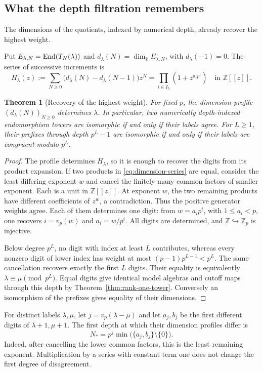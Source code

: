 \documentclass[11pt,reqno]{amsart}
\newcommand{\kk}{\Bbbk}\newcommand{\ZZ}{\mathbb Z}\newcommand{\NN}{\mathbb N}
\newtheorem{theorem}{Theorem}[section]
\theoremstyle{definition}
\theoremstyle{remark}
\numberwithin{equation}{section}
\begin{document}
\subsection{What the depth filtration remembers}
The dimensions of the quotients, indexed by numerical depth,
already recover the highest weight.

Put $E_{\lambda,N}=\operatorname{End}(T_N(\lambda))$ and
$d_\lambda(N)=\dim_\kk E_{\lambda,N}$, with $d_\lambda(-1)=0$.
The series of successive increments is
\begin{equation}\label{eq:dimension-series}
 H_\lambda(z):=\sum_{N\geq0}
       \bigl(d_\lambda(N)-d_\lambda(N-1)\bigr)z^N
   =\prod_{i\in I_\lambda}(1+z^{a_ip^i})\quad\text{in }\ZZ[[z]].
\end{equation}

\begin{theorem}[Recovery of the highest weight]\label{thm:depth-rigidity}
For fixed $p$, the dimension profile $(d_\lambda(N))_{N\geq0}$
determines $\lambda$. In particular, two numerically depth-indexed
endomorphism towers are isomorphic if and only if their labels agree.
For $L\geq1$, their prefixes through depth $p^L-1$ are isomorphic
if and only if their labels are congruent modulo $p^L$.
\end{theorem}
\begin{proof}
The profile determines $H_\lambda$, so it is enough to recover the
digits from its product expansion. If two products in
\eqref{eq:dimension-series} are equal, consider the least differing
exponent $w$ and cancel the finitely many common factors of smaller
exponent. Each is a unit in $\ZZ[[z]]$. At exponent $w$, the two remaining
products have different coefficients of $z^w$, a contradiction.
Thus the positive generator weights agree. Each of them determines
one digit: from
$w=a_ip^i$, with $1\leq a_i<p$, one recovers $i=v_p(w)$ and
$a_i=w/p^i$. All digits are determined, and
$\ZZ\hookrightarrow\ZZ_p$ is injective.

Below degree $p^L$, no digit with index at least $L$ contributes,
whereas every nonzero digit of lower index has weight at most
$(p-1)p^{L-1}<p^L$. The same cancellation recovers exactly the first
$L$ digits. Their equality is equivalently
$\lambda\equiv\mu\pmod{p^L}$. Equal digits give identical model
algebras and cutoff maps through this depth by
Theorem~\ref{thm:rank-one-tower}. Conversely an isomorphism of the
prefixes gives equality of their dimensions.
\end{proof}

For distinct labels $\lambda,\mu$, let $j=v_p(\lambda-\mu)$ and
let $a_j,b_j$ be the first different digits of $\lambda+1,\mu+1$.
The first depth at which their dimension profiles differ is
\[
 N_*=p^j\min\bigl(\{a_j,b_j\}\setminus\{0\}\bigr).
\]
Indeed, after cancelling the lower common factors, this is the least
remaining exponent. Multiplication by a series with constant term one
does not change the first degree of disagreement.
\end{document}
